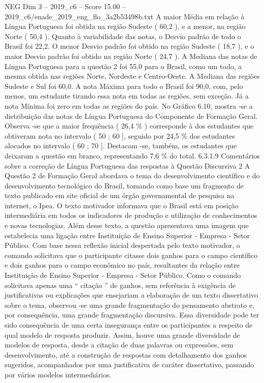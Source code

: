 \begin{textsample}{NEG Dim 3 – 2019\_c6 – Score 15.00 – 2019\_c6/enade\_2019\_eng\_flo\_3a2b53498b.txt}
A maior Média em relação à Língua Portuguesa foi obtida na região Sudeste ( 60,2 ), e a menor, na região Norte ( 50,4 ).
Quanto à variabilidade das notas, o Desvio padrão de todo o Brasil foi 22,2.
O menor Desvio padrão foi obtido na região Sudeste ( 18,7 ), e o maior Desvio padrão foi obtido na região Norte ( 24,7 ).
A Mediana das notas de Língua Portuguesa para a questão 2 foi 55,0 para o Brasil, como um todo, a mesma obtida nas regiões Norte, Nordeste e Centro-Oeste.
A Mediana das regiões Sudeste e Sul foi 60,0.
A nota Máxima para todo o Brasil foi 90,0, com, pelo menos, um estudante tirando essa nota em todas as regiões, sem exceção.
Já a nota Mínima foi zero em todas as regiões do país.
No Gráfico 6.10, mostra -se a distribuição das notas de Língua Portuguesa do Componente de Formação Geral.
Observa -se que a maior frequência ( 26,4 \% ) corresponde à dos estudantes que obtiveram nota no intervalo ( 50 ; 60 ], seguido por 24,5 \% dos estudantes alocados no intervalo ( 60 ; 70 ].
Destacam -se, também, os estudantes que deixaram a questão em branco, representando 7,6 \% do total. 6.3.1.9 Comentários sobre a correção de Língua Portuguesa das respostas à Questão Discursiva 2 A Questão 2 de Formação Geral abordava o tema do desenvolvimento científico e do desenvolvimento tecnológico do Brasil, tomando como base um fragmento de texto publicado em site oficial de um órgão governamental de pesquisa na internet, o Ipea.
O texto motivador informava que o Brasil está em posição intermediária em todos os indicadores de produção e utilização de conhecimentos e novas tecnologias.
Além desse texto, a questão apresentava uma imagem que estabelecia uma ligação entre Instituição de Ensino Superior - Empresa - Setor Público.
Com base nessa reflexão inicial despertada pelo texto motivador, o comando solicitava que o participante citasse dois ganhos para o campo científico e dois ganhos para o campo econômico no país, resultantes da relação entre Instituição de Ensino Superior - Empresa - Setor Público.
Como o comando solicitava apenas uma “ citação ” de ganhos, sem referência à exigência de justificativas ou explicações que ensejariam a elaboração de um texto dissertativo sobre o tema, observou -se uma grande fragmentação do pensamento abstrato e, por consequência, uma grande fragmentação discursiva.
Essa diversidade pode ter sido consequência de uma certa insegurança entre os participantes a respeito de qual modelo de resposta produzir.
Assim, houve uma grande diversidade de modelos de resposta, desde a citação de duas palavras ou expressões, sem desenvolvimento, até a construção de respostas com detalhamento dos ganhos sugeridos, acompanhados por uma justificativa de caráter dissertativo, passando por vários modelos intermediários.

\end{textsample}
